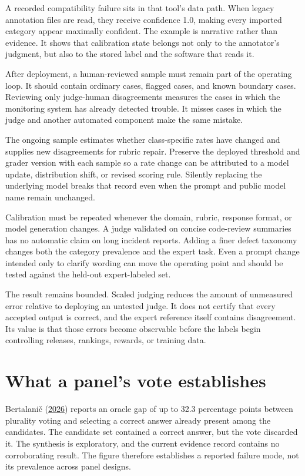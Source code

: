A recorded compatibility failure sits in that tool's data path. When legacy annotation files are read, they receive confidence 1.0, making every imported category appear maximally confident. The example is narrative rather than evidence. It shows that calibration state belongs not only to the annotator's judgment, but also to the stored label and the software that reads it.

After deployment, a human-reviewed sample must remain part of the operating loop. It should contain ordinary cases, flagged cases, and known boundary cases. Reviewing only judge-human disagreements measures the cases in which the monitoring system has already detected trouble. It misses cases in which the judge and another automated component make the same mistake.

The ongoing sample estimates whether class-specific rates have changed and supplies new disagreements for rubric repair. Preserve the deployed threshold and grader version with each sample so a rate change can be attributed to a model update, distribution shift, or revised scoring rule. Silently replacing the underlying model breaks that record even when the prompt and public model name remain unchanged.

Calibration must be repeated whenever the domain, rubric, response format, or model generation changes. A judge validated on concise code-review summaries has no automatic claim on long incident reports. Adding a finer defect taxonomy changes both the category prevalence and the expert task. Even a prompt change intended only to clarify wording can move the operating point and should be tested against the held-out expert-labeled set.

The result remains bounded. Scaled judging reduces the amount of unmeasured error relative to deploying an untested judge. It does not certify that every accepted output is correct, and the expert reference itself contains disagreement. Its value is that those errors become observable before the labels begin controlling releases, rankings, rewards, or training data.

\section{What a panel's vote establishes}\label{what-a-panels-vote-establishes}

Bertalani\v{c} (\href{https://arxiv.org/abs/2605.00914}{2026}) reports an oracle gap of up to 32.3 percentage points between plurality voting and selecting a correct answer already present among the candidates. The candidate set contained a correct answer, but the vote discarded it. The synthesis is exploratory, and the current evidence record contains no corroborating result. The figure therefore establishes a reported failure mode, not its prevalence across panel designs.

